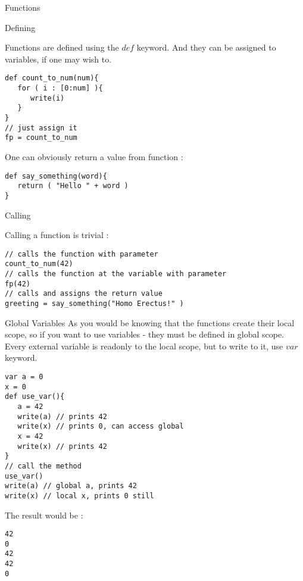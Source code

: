 \begin{section}{Functions}

\begin{subsection}{Defining}

Functions are defined using the $def$ keyword.
And they can be assigned to variables, if one may wish to.
\begin{lstlisting}[style=JexlStyle]
def count_to_num(num){
   for ( i : [0:num] ){
      write(i)
   }
}
// just assign it 
fp = count_to_num
\end{lstlisting}

One can obviously return a value from function :

\begin{lstlisting}[style=JexlStyle]
def say_something(word){
   return ( "Hello " + word ) 
}
\end{lstlisting}
\end{subsection}

\begin{subsection}{Calling}

Calling a function is trivial :

\begin{lstlisting}[style=JexlStyle]
// calls the function with parameter
count_to_num(42) 
// calls the function at the variable with parameter
fp(42) 
// calls and assigns the return value 
greeting = say_something("Homo Erectus!" ) 
\end{lstlisting}

\end{subsection}

\begin{subsection}{Global Variables}
As you would be knowing that the functions create their local scope, 
so if you want to use variables - they must be defined in global scope.
Every external variable is readonly to the local scope, but to write to it, use $var$ keyword.  

\begin{lstlisting}[style=JexlStyle]
var a = 0
x = 0 
def use_var(){
   a = 42 
   write(a) // prints 42 
   write(x) // prints 0, can access global 
   x = 42 
   write(x) // prints 42 
}
// call the method
use_var()
write(a) // global a, prints 42 
write(x) // local x, prints 0 still
\end{lstlisting}
The result would be :
\begin{lstlisting}[style=all]
42
0
42
42
0
\end{lstlisting}
\end{subsection}

\end{section}


